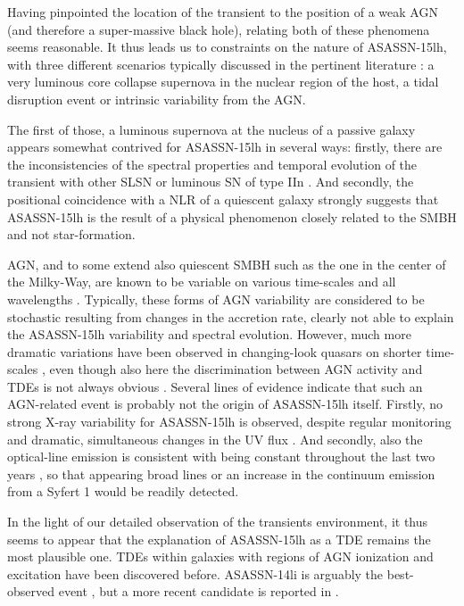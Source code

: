 \documentclass[traditabstract]{aa}
\begin{document}
Having pinpointed the location of the transient to the position of a weak AGN (and therefore a super-massive black hole), relating both of these phenomena seems reasonable. It thus leads us to constraints on the nature of ASASSN-15lh, with three different scenarios typically discussed in the pertinent literature \citep[e.g.,][]{2011ApJ...735..106D, 2014MNRAS.445.3263H, 2015ApJ...798...12V}: a very luminous core collapse supernova in the nuclear region of the host, a tidal disruption event or intrinsic variability from the AGN.

The first of those, a luminous supernova at the nucleus of a passive galaxy appears somewhat contrived for ASASSN-15lh in several ways: firstly, there are the inconsistencies of the spectral properties and temporal evolution of the transient with other SLSN or luminous SN of type IIn \citep{}. And secondly, the positional coincidence with a NLR of a quiescent galaxy strongly suggests that ASASSN-15lh is the result of a physical phenomenon closely related to the SMBH and not star-formation. 

AGN, and to some extend also quiescent SMBH such as the one in the center of the Milky-Way, are known to be variable on various time-scales and all wavelengths \citep[e.g.,][]{1997ARA&A..35..445U, 2001Natur.413...45B}. Typically, these forms of AGN variability are considered to be stochastic resulting from changes in the accretion rate, clearly not able to explain the ASASSN-15lh variability and spectral evolution. However, much more dramatic variations have been observed in changing-look quasars on shorter time-scales \citep[e.g.,][]{2014ApJ...788...48S, 2015ApJ...800..144L, 2017ApJ...835..144G}, even though also here the discrimination between AGN activity and TDEs is not always obvious \citep{2015MNRAS.452...69M}. Several lines of evidence indicate that such an AGN-related event is probably not the origin of ASASSN-15lh itself. Firstly, no strong X-ray variability for ASASSN-15lh is observed, despite regular monitoring and dramatic, simultaneous changes in the UV flux \citep{2016ApJ...828....3B, 2017ApJ...836...25M}. And secondly, also the optical-line emission is consistent with being constant throughout the last two years \citep{2016NatAs...1E...2L}, so that appearing broad lines or an increase in the continuum emission from a Syfert 1 would be readily detected.

In the light of our detailed observation of the transients environment, it thus seems to appear that the explanation of ASASSN-15lh as a TDE \citep{2016NatAs...1E...2L, 2017ApJ...836...25M} remains the most plausible one. TDEs within galaxies with regions of AGN ionization and excitation have been discovered before. ASASSN-14li is arguably the best-observed event \citep{2016MNRAS.455.2918H, 2016ApJ...830L..32P}, but a more recent candidate is reported in \citet{2017arXiv170307816B}. 
\end{document}
